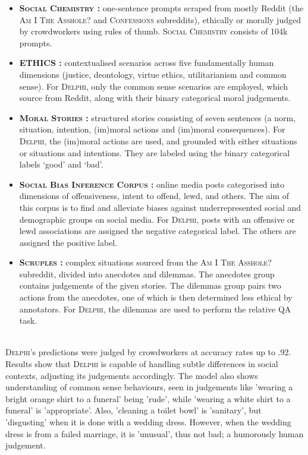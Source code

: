 \documentclass[final]{clv3} %
\begin{document}
\begin{itemize}
  \item \textbf{\textsc{Social Chemistry} \cite{forbes}:} one-sentence prompts scraped from mostly Reddit (the \textsc{Am I The Asshole?} and \textsc{Confessions} subreddits), ethically or morally judged by crowdworkers using rules of thumb. \textsc{Social Chemistry} consists of 104k prompts. 
  \item \textbf{\textsc{ETHICS} \cite{hendrycks} :} contextualised scenarios across five fundamentally human dimensions (justice, deontology, virtue ethics, utilitarianism and common sense). For \textsc{Delphi}, only the common sense scenarios are employed, which source from Reddit, along with their binary categorical moral judgements. 
  \item \textbf{\textsc{Moral Stories} \cite{emelin}:} structured stories consisting of seven sentences (a norm, situation, intention, (im)moral actions and (im)moral consequences). For \textsc{Delphi}, the (im)moral actions are used, and grounded with either situations or situations and intentions. They are labeled using the binary categorical labels ‘good’ and ‘bad’. 
  \item \textbf{\textsc{Social Bias Inference Corpus} \cite{sap}:} online media posts categorised into dimensions of offensiveness, intent to offend, lewd, and others. The aim of this corpus is to find and alleviate biases against underrepresented social and demographic groups on social media. For \textsc{Delphi}, posts with an offensive or lewd associations are assigned the negative categorical label. The others are assigned the positive label. 
  \item \textbf{\textsc{Scruples} \cite{lourie-scruples}:}  complex situations sourced from the \textsc{Am I The Asshole?} subreddit, divided into anecdotes and dilemmas. The anecdotes group contains judgements of the given stories. The dilemmas group pairs two actions from the anecdotes, one of which is then determined less ethical by annotators. For \textsc{Delphi}, the dilemmas are used to perform the relative QA task. 
\end{itemize}\\

\textsc{Delphi}’s predictions were judged by crowdworkers at accuracy rates up to .92. Results show that \textsc{Delphi} is capable of handling subtle differences in social contexts, adjusting its judgements accordingly. The model also shows understanding of common sense behaviours, seen in judgements like 'wearing a bright orange shirt to a funeral' being 'rude', while 'wearing a white shirt to a funeral' is 'appropriate'. Also, 'cleaning a toilet bowl' is 'sanitary', but 'disgusting' when it is done with a wedding dress. However, when the wedding dress is from a failed marriage, it is 'unusual', thus not bad; a humorously human judgement. \\
\end{document}
